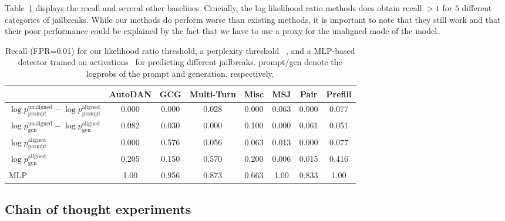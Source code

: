 Table~\ref{tab:log_ratio_table} displays the recall and several other baselines. Crucially, the log likelihood ratio methods does obtain recall $>1$ for $5$ different categories of jailbreaks. While our methods do perform worse than existing methods, it is important to note that they still work and that their poor performance could be explained by the fact that we have to use a proxy for the unaligned mode of the model. 

\begin{table}[H]
\caption{Recall (\textrm{FPR}=0.01) for our  likelihood ratio threshold, a perplexity threshold ~\citep{alon2023detectinglanguagemodelattacks}, and a MLP-based detector trained on activations~\citep{bailey2024obfuscatedactivationsbypassllm} for predicting different jailbreaks. \textrm{prompt/gen} denote the logprobs of the prompt and generation, respectively.} 
\label{tab:log_ratio_table}
\centering
\begin{tabular}{l|ccccccc}
\toprule
& \textbf{AutoDAN}  & \textbf{GCG} & \textbf{Multi-Turn} & \textbf{Misc} & \textbf{MSJ} & \textbf{Pair} & \textbf{Prefill} \\
\midrule
$\log p^{\textrm{unaligned}}_{\textrm{prompt}}-\log p^{\textrm{aligned}}_{\textrm{prompt}}$ & 0.000  & 0.000 & 0.028 & 0.000 & 0.063 & 0.000 & 0.077 \\
$\log p^{\textrm{unaligned}}_{\textrm{gen}}-\log p^{\textrm{aligned}}_{\textrm{gen}}$ & 0.082  & 0.030 & 0.000 & 0.100 & 0.000 & 0.061 & 0.051 \\
$\log p^{\textrm{aligned}}_{\textrm{prompt}}$ & 0.000  & 0.576 & 0.056 & 0.063 & 0.013 & 0.000 & 0.077 \\
$\log p^{\textrm{aligned}}_{\textrm{gen}}$ & 0.205 & 0.150 & 0.570 & 0.200 & 0.006 & 0.015 & 0.416 \\
MLP  & 1.00 & 0.956 & 0.873 & 0.663  & 1.00 & 0.833 & 1.00 \\
\bottomrule
\end{tabular}
\end{table}

\subsection{Chain of thought experiments}\label{app:cot_experiment_details}
